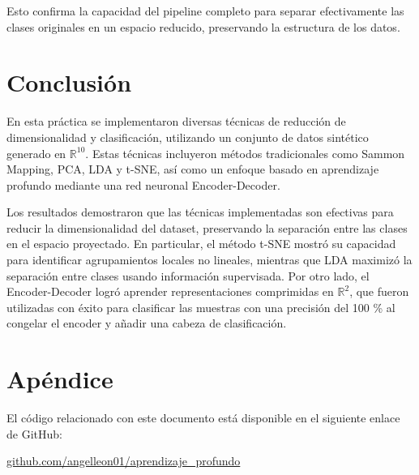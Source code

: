 \documentclass[paper=a4, fontsize=11pt]{scrartcl} %
\numberwithin{equation}{section} %
\numberwithin{figure}{section} %
\numberwithin{table}{section} %
\begin{document}
Esto confirma la capacidad del pipeline completo para separar efectivamente las clases originales en un espacio reducido, preservando la estructura de los datos.





\section{Conclusión}

En esta práctica se implementaron diversas técnicas de reducción de dimensionalidad y clasificación, utilizando un conjunto de datos sintético generado en \(\mathbb{R}^{10}\). Estas técnicas incluyeron métodos tradicionales como Sammon Mapping, PCA, LDA y t-SNE, así como un enfoque basado en aprendizaje profundo mediante una red neuronal Encoder-Decoder.

Los resultados demostraron que las técnicas implementadas son efectivas para reducir la dimensionalidad del dataset, preservando la separación entre las clases en el espacio proyectado. En particular, el método t-SNE mostró su capacidad para identificar agrupamientos locales no lineales, mientras que LDA maximizó la separación entre clases usando información supervisada. Por otro lado, el Encoder-Decoder logró aprender representaciones comprimidas en \(\mathbb{R}^{2}\), que fueron utilizadas con éxito para clasificar las muestras con una precisión del 100 \% al congelar el encoder y añadir una cabeza de clasificación.

\newpage
\appendix
\section*{Apéndice}
El código relacionado con este documento está disponible en el siguiente enlace de GitHub:
\begin{center}
    \href{https://github.com/angelleon01/aprendizaje_profundo}{github.com/angelleon01/aprendizaje\_profundo}
\end{center}
\end{document}
